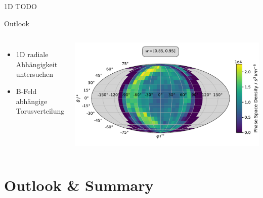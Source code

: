 \documentclass{beamer}
\begin{document}

\begin{frame}{1D}
TODO
\end{frame}


\begin{frame}{Outlook}

\begin{columns}
	\column{5.8cm}
\begin{itemize}
	\item 1D radiale Abhängigkeit untersuchen
	\item B-Feld abhängige Torusverteilung
\end{itemize}
	\column{10cm}
	
	\includegraphics[scale=.21]{Pics/sky_ps.pdf}
\end{columns}






\end{frame}



\section{Outlook \& Summary}
\end{document}

